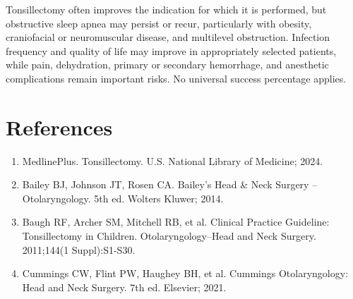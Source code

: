 Tonsillectomy often improves the indication for which it is performed, but obstructive sleep apnea may persist or recur, particularly with obesity, craniofacial or neuromuscular disease, and multilevel obstruction. Infection frequency and quality of life may improve in appropriately selected patients, while pain, dehydration, primary or secondary hemorrhage, and anesthetic complications remain important risks. No universal success percentage applies.

\section*{References}
\begin{enumerate}
  \item MedlinePlus. Tonsillectomy. U.S. National Library of Medicine; 2024.
  \item Bailey BJ, Johnson JT, Rosen CA. Bailey's Head \& Neck Surgery -- Otolaryngology. 5th ed. Wolters Kluwer; 2014.
  \item Baugh RF, Archer SM, Mitchell RB, et al. Clinical Practice Guideline: Tonsillectomy in Children. Otolaryngology--Head and Neck Surgery. 2011;144(1 Suppl):S1-S30.
  \item Cummings CW, Flint PW, Haughey BH, et al. Cummings Otolaryngology: Head and Neck Surgery. 7th ed. Elsevier; 2021.
\end{enumerate}

\clearpage
